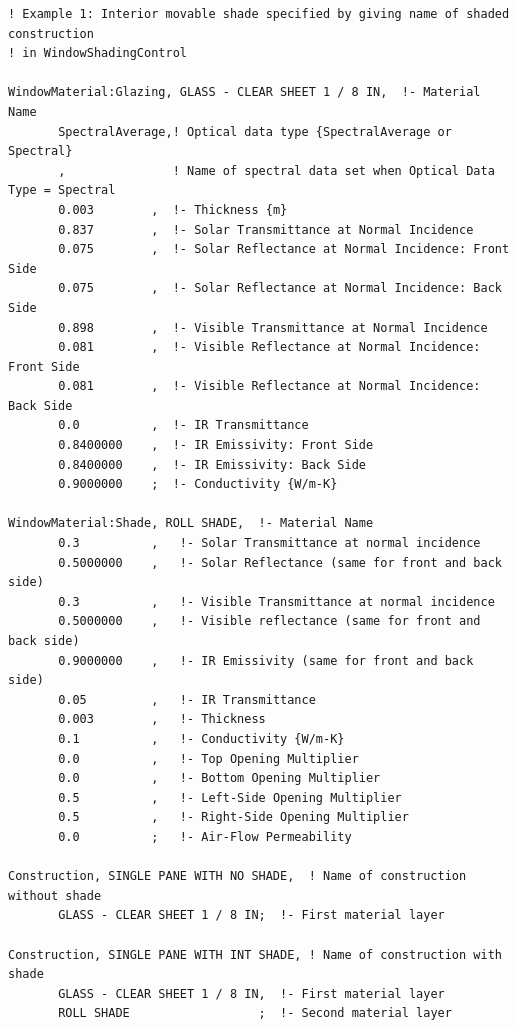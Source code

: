 \begin{lstlisting}
! Example 1: Interior movable shade specified by giving name of shaded construction
! in WindowShadingControl

WindowMaterial:Glazing, GLASS - CLEAR SHEET 1 / 8 IN,  !- Material Name
       SpectralAverage,! Optical data type {SpectralAverage or Spectral}
       ,               ! Name of spectral data set when Optical Data Type = Spectral
       0.003        ,  !- Thickness {m}
       0.837        ,  !- Solar Transmittance at Normal Incidence
       0.075        ,  !- Solar Reflectance at Normal Incidence: Front Side
       0.075        ,  !- Solar Reflectance at Normal Incidence: Back Side
       0.898        ,  !- Visible Transmittance at Normal Incidence
       0.081        ,  !- Visible Reflectance at Normal Incidence: Front Side
       0.081        ,  !- Visible Reflectance at Normal Incidence: Back Side
       0.0          ,  !- IR Transmittance
       0.8400000    ,  !- IR Emissivity: Front Side
       0.8400000    ,  !- IR Emissivity: Back Side
       0.9000000    ;  !- Conductivity {W/m-K}

WindowMaterial:Shade, ROLL SHADE,  !- Material Name
       0.3          ,   !- Solar Transmittance at normal incidence
       0.5000000    ,   !- Solar Reflectance (same for front and back side)
       0.3          ,   !- Visible Transmittance at normal incidence
       0.5000000    ,   !- Visible reflectance (same for front and back side)
       0.9000000    ,   !- IR Emissivity (same for front and back side)
       0.05         ,   !- IR Transmittance
       0.003        ,   !- Thickness
       0.1          ,   !- Conductivity {W/m-K}
       0.0          ,   !- Top Opening Multiplier
       0.0          ,   !- Bottom Opening Multiplier
       0.5          ,   !- Left-Side Opening Multiplier
       0.5          ,   !- Right-Side Opening Multiplier
       0.0          ;   !- Air-Flow Permeability

Construction, SINGLE PANE WITH NO SHADE,  ! Name of construction without shade
       GLASS - CLEAR SHEET 1 / 8 IN;  !- First material layer

Construction, SINGLE PANE WITH INT SHADE, ! Name of construction with shade
       GLASS - CLEAR SHEET 1 / 8 IN,  !- First material layer
       ROLL SHADE                  ;  !- Second material layer


\end{lstlisting}
